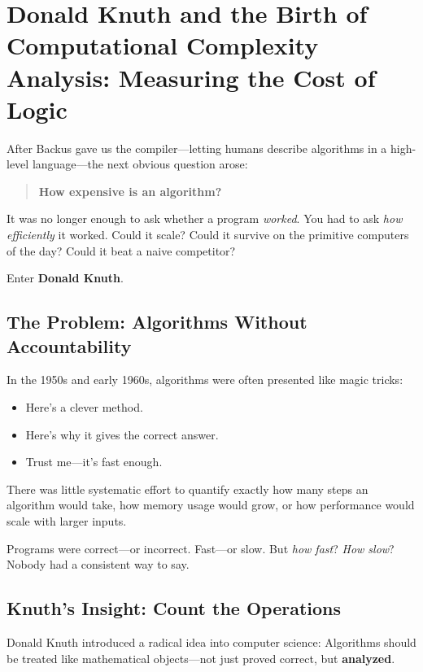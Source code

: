 \section{Donald Knuth and the Birth of Computational Complexity Analysis: Measuring the Cost of Logic}

After Backus gave us the compiler—letting humans describe algorithms in a high-level language—the next obvious question arose:

\begin{quote}
\textbf{How expensive is an algorithm?}
\end{quote}

It was no longer enough to ask whether a program \textit{worked}.
You had to ask \textit{how efficiently} it worked.
Could it scale? Could it survive on the primitive computers of the day? Could it beat a naive competitor?

Enter \textbf{Donald Knuth}.

\subsection{The Problem: Algorithms Without Accountability}

In the 1950s and early 1960s, algorithms were often presented like magic tricks:

\begin{itemize}
    \item Here’s a clever method.
    \item Here’s why it gives the correct answer.
    \item Trust me—it’s fast enough.
\end{itemize}

There was little systematic effort to quantify exactly how many steps an algorithm would take, how memory usage would grow, or how performance would scale with larger inputs.

Programs were correct—or incorrect.  
Fast—or slow.  
But \textit{how fast}? \textit{How slow}? Nobody had a consistent way to say.

\subsection{Knuth’s Insight: Count the Operations}

Donald Knuth introduced a radical idea into computer science:  
Algorithms should be treated like mathematical objects—not just proved correct, but \textbf{analyzed}.

